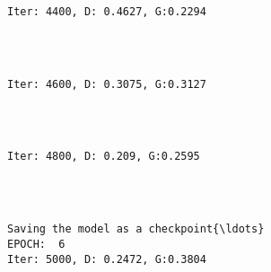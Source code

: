 \documentclass[11pt]{article}
\begin{document}
    \begin{Verbatim}[commandchars=\\\{\}]

Iter: 4400, D: 0.4627, G:0.2294
    \end{Verbatim}

    \begin{center}
    \end{center}
    { \hspace*{\fill} \\}
    
    \begin{Verbatim}[commandchars=\\\{\}]

Iter: 4600, D: 0.3075, G:0.3127
    \end{Verbatim}

    \begin{center}
    \end{center}
    { \hspace*{\fill} \\}
    
    \begin{Verbatim}[commandchars=\\\{\}]

Iter: 4800, D: 0.209, G:0.2595
    \end{Verbatim}

    \begin{center}
    \end{center}
    { \hspace*{\fill} \\}
    
    \begin{Verbatim}[commandchars=\\\{\}]

Saving the model as a checkpoint{\ldots}
EPOCH:  6
Iter: 5000, D: 0.2472, G:0.3804
    \end{Verbatim}

    \begin{center}
    \end{center}
    { \hspace*{\fill} \\}
    
\end{document}
